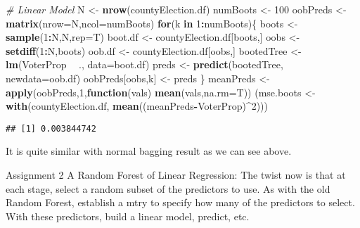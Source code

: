 \documentclass[]{article}
\newenvironment{Shaded}{\begin{snugshade}}{\end{snugshade}}
\newcommand{\CommentTok}[1]{\textcolor[rgb]{0.56,0.35,0.01}{\textit{#1}}}
\newcommand{\ControlFlowTok}[1]{\textcolor[rgb]{0.13,0.29,0.53}{\textbf{#1}}}
\newcommand{\DataTypeTok}[1]{\textcolor[rgb]{0.13,0.29,0.53}{#1}}
\newcommand{\DecValTok}[1]{\textcolor[rgb]{0.00,0.00,0.81}{#1}}
\newcommand{\KeywordTok}[1]{\textcolor[rgb]{0.13,0.29,0.53}{\textbf{#1}}}
\newcommand{\NormalTok}[1]{#1}
\newcommand{\OperatorTok}[1]{\textcolor[rgb]{0.81,0.36,0.00}{\textbf{#1}}}
\newcommand{\StringTok}[1]{\textcolor[rgb]{0.31,0.60,0.02}{#1}}
\begin{document}
\begin{Shaded}
\begin{Highlighting}[]
\CommentTok{# Linear Model}
\NormalTok{N <-}\StringTok{ }\KeywordTok{nrow}\NormalTok{(countyElection.df)}
\NormalTok{numBoots <-}\StringTok{ }\DecValTok{100}
\NormalTok{oobPreds <-}\StringTok{ }\KeywordTok{matrix}\NormalTok{(}\DataTypeTok{nrow=}\NormalTok{N,}\DataTypeTok{ncol=}\NormalTok{numBoots)}
\ControlFlowTok{for}\NormalTok{(k }\ControlFlowTok{in} \DecValTok{1}\OperatorTok{:}\NormalTok{numBoots)\{}
\NormalTok{  boots <-}\StringTok{ }\KeywordTok{sample}\NormalTok{(}\DecValTok{1}\OperatorTok{:}\NormalTok{N,N,}\DataTypeTok{rep=}\NormalTok{T) }
\NormalTok{  boot.df <-}\StringTok{ }\NormalTok{countyElection.df[boots,]}
\NormalTok{  oobs <-}\StringTok{ }\KeywordTok{setdiff}\NormalTok{(}\DecValTok{1}\OperatorTok{:}\NormalTok{N,boots) }
\NormalTok{  oob.df <-}\StringTok{ }\NormalTok{countyElection.df[oobs,] }
\NormalTok{  bootedTree <-}\StringTok{ }\KeywordTok{lm}\NormalTok{(VoterProp }\OperatorTok{~}\StringTok{ }\NormalTok{.,}
                   \DataTypeTok{data=}\NormalTok{boot.df)}
\NormalTok{  preds <-}\StringTok{ }\KeywordTok{predict}\NormalTok{(bootedTree, }\DataTypeTok{newdata=}\NormalTok{oob.df)}
\NormalTok{  oobPreds[oobs,k] <-}\StringTok{ }\NormalTok{preds }
\NormalTok{\}}
\NormalTok{meanPreds <-}\StringTok{ }\KeywordTok{apply}\NormalTok{(oobPreds,}\DecValTok{1}\NormalTok{,}\ControlFlowTok{function}\NormalTok{(vals) }\KeywordTok{mean}\NormalTok{(vals,}\DataTypeTok{na.rm=}\NormalTok{T))}
\NormalTok{(mse.boots <-}\StringTok{ }\KeywordTok{with}\NormalTok{(countyElection.df, }\KeywordTok{mean}\NormalTok{((meanPreds}\OperatorTok{-}\NormalTok{VoterProp)}\OperatorTok{^}\DecValTok{2}\NormalTok{)))}
\end{Highlighting}
\end{Shaded}

\begin{verbatim}
## [1] 0.003844742
\end{verbatim}

It is quite similar with normal bagging result as we can see above.

Assignment 2 A Random Forest of Linear Regression: The twist now is that
at each stage, select a random subset of the predictors to use. As with
the old Random Forest, establish a mtry to specify how many of the
predictors to select. With these predictors, build a linear model,
predict, etc.
\end{document}
